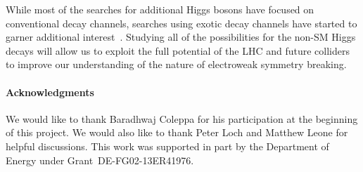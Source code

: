 While most of the searches for additional Higgs bosons have focused on conventional decay channels, searches using exotic decay channels have started to garner additional interest~\cite{Curtin:2013fra, Brownson:2013lka, Coleppa:2014hxa, Coleppa:2014cca,Li:2015lra,Dorsch:2014qja,Chen:2013emb,Chen:2014dma,Enberg:2014pua,CMS:2014yra,Aad:2015wra,CMS:2013eua}. Studying all of the possibilities for the non-SM Higgs decays will allow us to exploit the full potential of the LHC and future colliders to improve our understanding of the nature of electroweak symmetry breaking.
\paragraph{Acknowledgments}
We would like to thank Baradhwaj Coleppa for his participation at the beginning of this project. We would also like to thank Peter Loch and Matthew Leone for helpful discussions. This work was supported in part by the Department of Energy under Grant~DE-FG02-13ER41976. 
